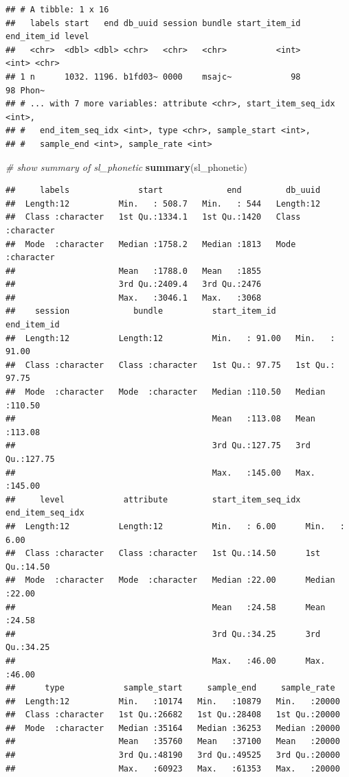\documentclass[]{book}
\newenvironment{Shaded}{\begin{snugshade}}{\end{snugshade}}
\newcommand{\CommentTok}[1]{\textcolor[rgb]{0.56,0.35,0.01}{\textit{#1}}}
\newcommand{\KeywordTok}[1]{\textcolor[rgb]{0.13,0.29,0.53}{\textbf{#1}}}
\newcommand{\NormalTok}[1]{#1}
\begin{document}
\begin{verbatim}
## # A tibble: 1 x 16
##   labels start   end db_uuid session bundle start_item_id end_item_id level
##   <chr>  <dbl> <dbl> <chr>   <chr>   <chr>          <int>       <int> <chr>
## 1 n      1032. 1196. b1fd03~ 0000    msajc~            98          98 Phon~
## # ... with 7 more variables: attribute <chr>, start_item_seq_idx <int>,
## #   end_item_seq_idx <int>, type <chr>, sample_start <int>,
## #   sample_end <int>, sample_rate <int>
\end{verbatim}

\begin{Shaded}
\begin{Highlighting}[]
\CommentTok{# show summary of sl_phonetic}
\KeywordTok{summary}\NormalTok{(sl_phonetic)}
\end{Highlighting}
\end{Shaded}

\begin{verbatim}
##     labels              start             end         db_uuid         
##  Length:12          Min.   : 508.7   Min.   : 544   Length:12         
##  Class :character   1st Qu.:1334.1   1st Qu.:1420   Class :character  
##  Mode  :character   Median :1758.2   Median :1813   Mode  :character  
##                     Mean   :1788.0   Mean   :1855                     
##                     3rd Qu.:2409.4   3rd Qu.:2476                     
##                     Max.   :3046.1   Max.   :3068                     
##    session             bundle          start_item_id     end_item_id    
##  Length:12          Length:12          Min.   : 91.00   Min.   : 91.00  
##  Class :character   Class :character   1st Qu.: 97.75   1st Qu.: 97.75  
##  Mode  :character   Mode  :character   Median :110.50   Median :110.50  
##                                        Mean   :113.08   Mean   :113.08  
##                                        3rd Qu.:127.75   3rd Qu.:127.75  
##                                        Max.   :145.00   Max.   :145.00  
##     level            attribute         start_item_seq_idx end_item_seq_idx
##  Length:12          Length:12          Min.   : 6.00      Min.   : 6.00   
##  Class :character   Class :character   1st Qu.:14.50      1st Qu.:14.50   
##  Mode  :character   Mode  :character   Median :22.00      Median :22.00   
##                                        Mean   :24.58      Mean   :24.58   
##                                        3rd Qu.:34.25      3rd Qu.:34.25   
##                                        Max.   :46.00      Max.   :46.00   
##      type            sample_start     sample_end     sample_rate   
##  Length:12          Min.   :10174   Min.   :10879   Min.   :20000  
##  Class :character   1st Qu.:26682   1st Qu.:28408   1st Qu.:20000  
##  Mode  :character   Median :35164   Median :36253   Median :20000  
##                     Mean   :35760   Mean   :37100   Mean   :20000  
##                     3rd Qu.:48190   3rd Qu.:49525   3rd Qu.:20000  
##                     Max.   :60923   Max.   :61353   Max.   :20000
\end{verbatim}
\end{document}
